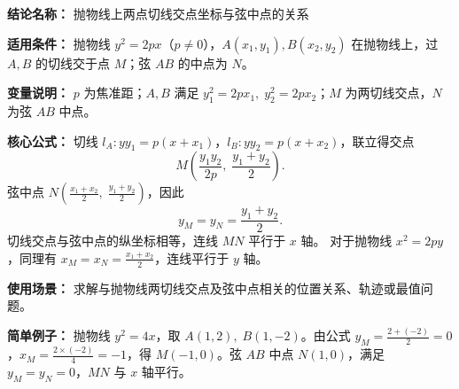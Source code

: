 \textbf{结论名称：} 抛物线上两点切线交点坐标与弦中点的关系

\textbf{适用条件：} 抛物线 \(y^{2}=2px\)（\(p\neq 0\)），\(A(x_{1},y_{1}),B(x_{2},y_{2})\) 在抛物线上，过 \(A,B\) 的切线交于点 \(M\)；弦 \(AB\) 的中点为 \(N\)。

\textbf{变量说明：} \(p\) 为焦准距；\(A,B\) 满足 \(y_{1}^{2}=2px_{1},\;y_{2}^{2}=2px_{2}\)；\(M\) 为两切线交点，\(N\) 为弦 \(AB\) 中点。

\textbf{核心公式：}
切线 \(l_{A}: yy_{1}=p(x+x_{1})\)，\(l_{B}: yy_{2}=p(x+x_{2})\)，联立得交点
\[
M\left(\frac{y_{1}y_{2}}{2p},\;\frac{y_{1}+y_{2}}{2}\right).
\]
弦中点 \(N\left(\frac{x_{1}+x_{2}}{2},\;\frac{y_{1}+y_{2}}{2}\right)\)，因此
\[
\boxed{y_{M}=y_{N}=\frac{y_{1}+y_{2}}{2}}.
\]
切线交点与弦中点的纵坐标相等，连线 \(MN\) 平行于 \(x\) 轴。
对于抛物线 \(x^{2}=2py\)，同理有 \(\boxed{x_{M}=x_{N}=\frac{x_{1}+x_{2}}{2}}\)，连线平行于 \(y\) 轴。

\textbf{使用场景：} 求解与抛物线两切线交点及弦中点相关的位置关系、轨迹或最值问题。

\textbf{简单例子：}
抛物线 \(y^{2}=4x\)，取 \(A(1,2),\;B(1,-2)\)。由公式 \(y_{M}=\frac{2+(-2)}{2}=0\)，\(x_{M}=\frac{2\times(-2)}{4}=-1\)，得 \(M(-1,0)\)。弦 \(AB\) 中点 \(N(1,0)\)，满足 \(y_{M}=y_{N}=0\)，\(MN\) 与 \(x\) 轴平行。